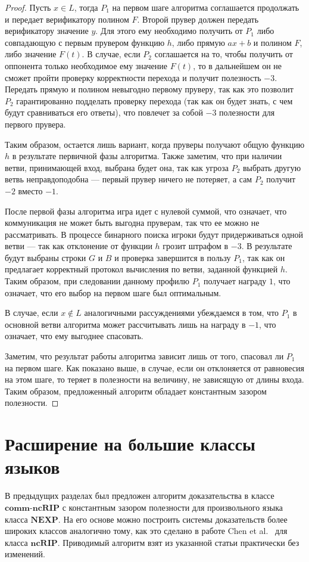 \documentclass[14pt, a4paper]{extreport}
\begin{document}
\begin{proof}
        Пусть $x \in L$, тогда $P_1$ на первом шаге алгоритма соглашается продолжать и передает верификатору полином $F$. Второй прувер должен передать верификатору значение $y$. Для этого ему необходимо получить от $P_1$ либо совпадающую с первым прувером функцию $h$, либо прямую $a x + b$ и полином $F$, либо значение $F(t)$. В случае, если $P_2$ соглашается на то, чтобы получить от оппонента только необходимое ему значение $F(t)$, то в дальнейшем он не сможет пройти проверку корректности перехода и получит полезность $-3$. Передать прямую и полином невыгодно первому пруверу, так как это позволит $P_2$ гарантированно подделать проверку перехода (так как он будет знать, с чем будут сравниваться его ответы), что повлечет за собой $-3$ полезности для первого прувера.

        Таким образом, остается лишь вариант, когда пруверы получают общую функцию $h$ в результате первичной фазы алгоритма. Также заметим, что при наличии ветви, принимающей вход, выбрана будет она, так как угроза $P_2$ выбрать другую ветвь неправдоподобна --- первый прувер ничего не потеряет, а сам $P_2$ получит $-2$ вместо $-1$.

        После первой фазы алгоритма игра идет с нулевой суммой, что означает, что коммуникация не может быть выгодна пруверам, так что ее можно не рассматривать. В процессе бинарного поиска игроки будут придерживаться одной ветви --- так как отклонение от функции $h$ грозит штрафом в $-3$. В результате будут выбраны строки $G$ и $B$ и проверка завершится в пользу $P_1$, так как он предлагает корректный протокол вычисления по ветви, заданной функцией $h$. Таким образом, при следовании данному профилю $P_1$ получает награду $1$, что означает, что его выбор на первом шаге был оптимальным.

        В случае, если $x \notin L$ аналогичными рассуждениями убеждаемся в том, что $P_1$ в основной ветви алгоритма может рассчитывать лишь на награду в $-1$, что означает, что ему выгоднее спасовать.

        Заметим, что результат работы алгоритма зависит лишь от того, спасовал ли $P_1$ на первом шаге. Как показано выше, в случае, если он отклоняется от равновесия на этом шаге, то теряет в полезности на величину, не зависящую от длины входа. Таким образом, предложенный алгоритм обладает константным зазором полезности.
    \end{proof}
        \section{Расширение на большие классы языков}
        В предыдущих разделах был предложен алгоритм доказательства в классе $\textbf{comm-ncRIP}$ с константным зазором полезности для произвольного языка класса $\textbf{NEXP}$. На его основе можно построить системы доказательств более широких классов аналогично тому, как это сделано в работе Chen et al.~\cite{chen2017noncoop} для класса $\textbf{ncRIP}$. Приводимый алгоритм взят из указанной статьи практически без изменений.
\end{document}
